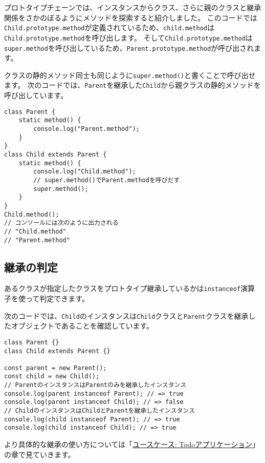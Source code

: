 プロトタイプチェーンでは、インスタンスからクラス、さらに親のクラスと継承関係をさかのぼるようにメソッドを探索すると紹介しました。
このコードでは\texttt{Child.prototype.method}が定義されているため、\texttt{child.method}は\texttt{Child.prototype.method}を呼び出します。
そして\texttt{Child.prototype.method}は\texttt{super.method}を呼び出しているため、\texttt{Parent.prototype.method}が呼び出されます。

クラスの静的メソッド同士も同じように\texttt{super.method()}と書くことで呼び出せます。
次のコードでは、\texttt{Parent}を継承した\texttt{Child}から親クラスの静的メソッドを呼び出しています。

\begin{lstlisting}
class Parent {
    static method() {
        console.log("Parent.method");
    }
}
class Child extends Parent {
    static method() {
        console.log("Child.method");
        // super.method()でParent.methodを呼びだす
        super.method();
    }
}
Child.method(); 
// コンソールには次のように出力される
// "Child.method"
// "Parent.method"
\end{lstlisting}

\hypertarget{instanceof}{%
\subsection{継承の判定}\label{instanceof}}

あるクラスが指定したクラスをプロトタイプ継承しているかは\texttt{instanceof}演算子を使って判定できます。

次のコードでは、\texttt{Child}のインスタンスは\texttt{Child}クラスと\texttt{Parent}クラスを継承したオブジェクトであることを確認しています。

\begin{lstlisting}
class Parent {}
class Child extends Parent {}

const parent = new Parent();
const child = new Child();
// ParentのインスタンスはParentのみを継承したインスタンス
console.log(parent instanceof Parent); // => true
console.log(parent instanceof Child); // => false
// ChildのインスタンスはChildとParentを継承したインスタンス
console.log(child instanceof Parent); // => true
console.log(child instanceof Child); // => true
\end{lstlisting}

より具体的な継承の使い方については「\hyperlink{todo-app}{ユースケース: Todoアプリケーション}」の章で見ていきます。

